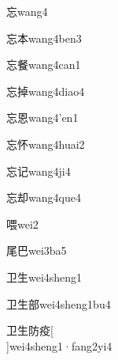 \begin{verbete}[7]{忘}{wang4}
\end{verbete}

\begin{verbete}[7;5]{忘本}{wang4ben3}
\end{verbete}

\begin{verbete}[7;16]{忘餐}{wang4can1}
\end{verbete}

\begin{verbete}[7;11]{忘掉}{wang4diao4}
\end{verbete}

\begin{verbete}[7;10]{忘恩}{wang4'en1}
\end{verbete}

\begin{verbete}[7;7]{忘怀}{wang4huai2}
\end{verbete}

\begin{verbete}[7;5]{忘记}{wang4ji4}
\end{verbete}

\begin{verbete}[7;7]{忘却}{wang4que4}
\end{verbete}

\begin{verbete}[12]{喂}{wei2}
\end{verbete}

\begin{verbete}[7;4]{尾巴}{wei3ba5}
\end{verbete}

\begin{verbete}[3;5]{卫生}{wei4sheng1}
\end{verbete}

\begin{verbete*}[3;5;10]{卫生部}{wei4sheng1bu4}
\end{verbete*}

\begin{verbete}[3;5;6;9]{卫生防疫}[\\]{wei4sheng1·fang2yi4}
\end{verbete}

